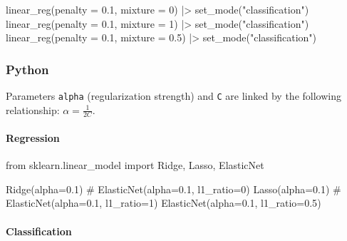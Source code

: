 \documentclass[
  letterpaper,
  DIV=11,
  numbers=noendperiod]{scrreprt}
\newenvironment{Shaded}{\begin{snugshade}}{\end{snugshade}}
\newcommand{\AttributeTok}[1]{\textcolor[rgb]{0.40,0.46,0.14}{#1}}
\newcommand{\CommentTok}[1]{\textcolor[rgb]{0.37,0.37,0.37}{#1}}
\newcommand{\DecValTok}[1]{\textcolor[rgb]{0.68,0.00,0.00}{#1}}
\newcommand{\FloatTok}[1]{\textcolor[rgb]{0.68,0.00,0.00}{#1}}
\newcommand{\FunctionTok}[1]{\textcolor[rgb]{0.28,0.35,0.67}{#1}}
\newcommand{\ImportTok}[1]{\textcolor[rgb]{0.00,0.46,0.62}{#1}}
\newcommand{\NormalTok}[1]{\textcolor[rgb]{0.00,0.46,0.62}{#1}}
\newcommand{\OperatorTok}[1]{\textcolor[rgb]{0.37,0.37,0.37}{#1}}
\newcommand{\SpecialCharTok}[1]{\textcolor[rgb]{0.37,0.37,0.37}{#1}}
\newcommand{\StringTok}[1]{\textcolor[rgb]{0.13,0.47,0.30}{#1}}
\let\oldparagraph\paragraph
\renewcommand{\paragraph}[1]{\oldparagraph{#1}\mbox{}}
\begin{document}
\begin{Shaded}
\begin{Highlighting}[]
\FunctionTok{linear\_reg}\NormalTok{(}\AttributeTok{penalty =} \FloatTok{0.1}\NormalTok{, }\AttributeTok{mixture =} \DecValTok{0}\NormalTok{) }\SpecialCharTok{|\textgreater{}} \FunctionTok{set\_mode}\NormalTok{(}\StringTok{"classification"}\NormalTok{)}
\FunctionTok{linear\_reg}\NormalTok{(}\AttributeTok{penalty =} \FloatTok{0.1}\NormalTok{, }\AttributeTok{mixture =} \DecValTok{1}\NormalTok{) }\SpecialCharTok{|\textgreater{}} \FunctionTok{set\_mode}\NormalTok{(}\StringTok{"classification"}\NormalTok{)}
\FunctionTok{linear\_reg}\NormalTok{(}\AttributeTok{penalty =} \FloatTok{0.1}\NormalTok{, }\AttributeTok{mixture =} \FloatTok{0.5}\NormalTok{) }\SpecialCharTok{|\textgreater{}} \FunctionTok{set\_mode}\NormalTok{(}\StringTok{"classification"}\NormalTok{)}
\end{Highlighting}
\end{Shaded}

\hypertarget{python-73}{%
\subsubsection{Python}\label{python-73}}

Parameters \texttt{alpha} (regularization strength) and \texttt{C} are
linked by the following relationship: \(\alpha = \frac{1}{2C}\).

\hypertarget{regression-3}{%
\paragraph{Regression}\label{regression-3}}

\begin{Shaded}
\begin{Highlighting}[]
\ImportTok{from}\NormalTok{ sklearn.linear\_model }\ImportTok{import}\NormalTok{ Ridge, Lasso, ElasticNet}

\NormalTok{Ridge(alpha}\OperatorTok{=}\FloatTok{0.1}\NormalTok{) }\CommentTok{\# ElasticNet(alpha=0.1, l1\_ratio=0)}
\NormalTok{Lasso(alpha}\OperatorTok{=}\FloatTok{0.1}\NormalTok{) }\CommentTok{\# ElasticNet(alpha=0.1, l1\_ratio=1)}
\NormalTok{ElasticNet(alpha}\OperatorTok{=}\FloatTok{0.1}\NormalTok{, l1\_ratio}\OperatorTok{=}\FloatTok{0.5}\NormalTok{)}
\end{Highlighting}
\end{Shaded}

\hypertarget{classification-3}{%
\paragraph{Classification}\label{classification-3}}
\end{document}
